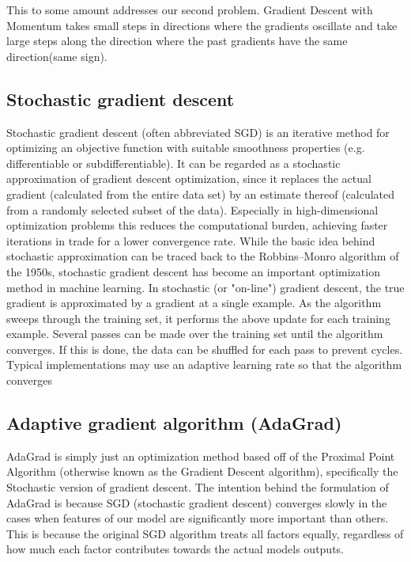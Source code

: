 This to some amount addresses our second problem. Gradient Descent with Momentum takes small 
steps in directions where the gradients oscillate and take large steps along the direction where
the past gradients have the same direction(same sign).

\subsection{Stochastic gradient descent}
\FloatBarrier
Stochastic gradient descent (often abbreviated SGD) is an iterative method for optimizing an
objective function with suitable smoothness properties (e.g. differentiable or subdifferentiable).
It can be regarded as a stochastic approximation of gradient descent optimization, since it 
replaces the actual gradient (calculated from the entire data set) by an estimate thereof 
(calculated from a randomly selected subset of the data). Especially in high-dimensional 
optimization problems this reduces the computational burden,
achieving faster iterations in trade for a lower convergence rate.
While the basic idea behind stochastic approximation can be traced back to the Robbins–Monro 
algorithm of the 1950s, stochastic gradient descent has become an important optimization
method in machine learning. 
In stochastic (or "on-line") gradient descent, the true gradient  is approximated by a gradient
at a single example.
As the algorithm sweeps through the training set, it performs the above update for each training
example. Several passes can be made over the training set until the algorithm converges.
If this is done, the data can be shuffled for each pass to prevent cycles.
Typical implementations may use an adaptive learning rate so that the algorithm converges

\subsection{Adaptive gradient algorithm (AdaGrad)}
\FloatBarrier
AdaGrad is simply just an optimization method based off of the Proximal Point Algorithm 
(otherwise known as the Gradient Descent algorithm), specifically the Stochastic version
of gradient descent.
The intention behind the formulation of AdaGrad is because SGD (stochastic gradient descent) 
converges slowly in the cases when features of our model are significantly more 
important than others. 
This is because the original SGD algorithm treats all factors equally, regardless of how much
each factor contributes towards the actual models outputs.

